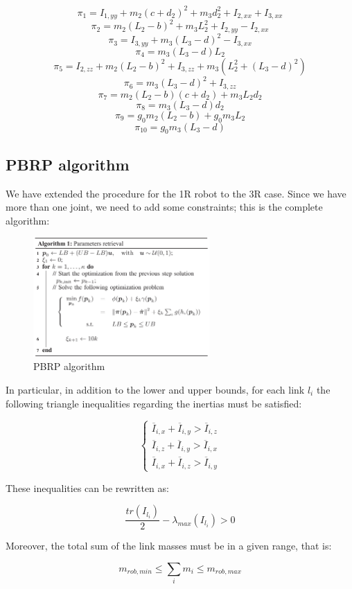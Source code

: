 \documentclass{article}
\begin{document}
\[\pi_1= I_{1,yy} + m_2 (c+ d_2)^2 + m_3 d_2^2 + I_{2,xx} + I_{3,xx}\]
\[\pi_2 = m_2(L_2 -b)^2 + m_3 L_2^2 + I_{2,yy} - I_{2,xx}\]
\[\pi_3 = I_{3,yy} + m_3(L_3 - d)^2 - I_{3,xx}\]
\[\pi_4 = m_3(L_3 -d)L_2\]
\[\pi_5 = I_{2,zz} + m_2(L_2 - b)^2 + I_{3,zz} + m_3(L_2^2 + (L_3 - d)^2 )\]
\[\pi_6 = m_3(L_3 -d)^2 + I_{3,zz}\]
\[\pi_7 = m_2(L_2 - b)(c+ d_2) + m_3 L_2 d_2\]
\[\pi_8 = m_3(L_3 - d)d_2\]
\[\pi_9 = g_0 m_2 (L_2 - b) + g_0 m_3 L_2\]
\[\pi_{10} = g_0 m_3 (L_3 - d)\]

\subsection{PBRP algorithm}
We have extended the procedure for the 1R robot to the 3R case. Since we have more than one joint, we need to add some constraints; this is the complete algorithm:
\FloatBarrier
\begin{figure}[!htbp]
\centering
\includegraphics[width=0.6\textwidth]{images/3-dof/algorithm.png}
\caption{PBRP algorithm}
\end{figure}
\FloatBarrier
In particular, in addition to the lower and upper bounds, for each link $l_i$ the following triangle inequalities regarding the inertias must be satisfied:

\[\begin{cases}
\overline{I}_{i,x}+\overline{I}_{i,y} > \overline{I}_{i,z} \\
\overline{I}_{i,z}+\overline{I}_{i,y} > \overline{I}_{i,x} \\
\overline{I}_{i,x}+\overline{I}_{i,z} > \overline{I}_{i,y}
\end{cases}\]

\noindent These inequalities can be rewritten as:

\[\frac{tr(I_{l_i})}{2}-\lambda_{max}(I_{l_i})>0\]

\noindent Moreover, the total sum of the link masses must be in a given range, that is:

\[m_{rob,min}\le \sum_i{m_i} \le m_{rob,max}\]
\end{document}
